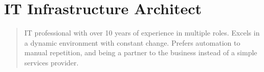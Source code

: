 \section*{IT Infrastructure Architect}
\begin{quote}
IT professional with over 10 years of experience in multiple roles.  Excels in a dynamic environment with constant change.  Prefers automation to manual repetition, and being a partner to the business instead of a simple services provider.
\end{quote}

